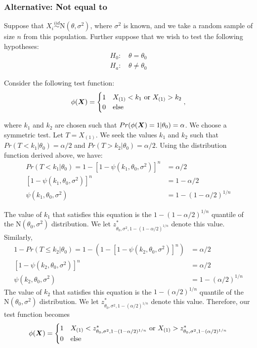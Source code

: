 \documentclass[]{article}
\newcommand{\bfX}{\mbox{\boldmath $X$}}
\begin{document}
\subsubsection{Alternative: Not equal to}

Suppose that $X_i \stackrel{iid}{\sim} \text{N}(\theta, \sigma^2)$, where $\sigma^2$ is known, and we take a random sample of size $n$ from this population. Further suppose that we wish to test the following hypotheses:
\[
\begin{split}
\text{$H_0$: }& \theta = \theta_0 \\
\text{$H_a$: }& \theta \neq \theta_0
\end{split}
\]

Consider the following test function:
\[
\phi(\bfX) = \begin{cases}
1 & X_{(1)} < k_1 \text{ or } X_{(1)} > k_2 \\
0 & \text{else}
\end{cases},
\]

where $k_1$ and $k_2$ are chosen such that $Pr(\phi(\bfX) = 1|\theta_0) = \alpha$. We choose a symmetric test. Let $T = X_{(1)}$. We seek the values $k_1$ and $k_2$ such that $Pr(T < k_1 | \theta_0) = \alpha/2$ and $Pr(T > k_2 | \theta_0) = \alpha/2$. Using the distribution function derived above, we have:
\[
\begin{split}
Pr(T < k_1 | \theta_0) = 1 - [1 - \psi(k_1, \theta_0, \sigma^2)]^n &= \alpha/2 \\
[1 - \psi(k_1, \theta_0, \sigma^2)]^n &= 1- \alpha/2 \\
\psi(k_1, \theta_0, \sigma^2) &= 1 - (1 - \alpha/2)^{1/n}
\end{split}
\]

The value of $k_1$ that satisfies this equation is the $1 - (1 - \alpha/2)^{1/n}$ quantile of the $\text{N}(\theta_0, \sigma^2)$ distribution. We let $z^*_{\theta_0, \sigma^2, 1 - (1-\alpha/2)^{1/n}}$ denote this value. Similarly,
\[
\begin{split}
1 - Pr(T \leq k_2 | \theta_0) = 1 - \left(1 - [1 - \psi(k_2, \theta_0, \sigma^2)]^n\right) &= \alpha/2 \\
[1 - \psi(k_2, \theta_0, \sigma^2)]^n &= \alpha/2 \\
\psi(k_2, \theta_0, \sigma^2) &= 1 - (\alpha/2)^{1/n}
\end{split}
\]
The value of $k_2$ that satisfies this equation is the $1 - (\alpha/2)^{1/n}$ quantile of the $\text{N}(\theta_0, \sigma^2)$ distribution. We let $z^*_{\theta_0, \sigma^2, 1 - (\alpha/2)^{1/n}}$ denote this value. Therefore, our test function becomes
\[
\phi(\bfX) = \begin{cases}
1 & X_{(1)} < z^*_{\theta_0, \sigma^2, 1 - (1-\alpha/2)^{1/n}} \text{ or } X_{(1)} > z^*_{\theta_0, \sigma^2, 1 - (\alpha/2)^{1/n}}\\
0 & \text{else}
\end{cases}
\]
\end{document}

